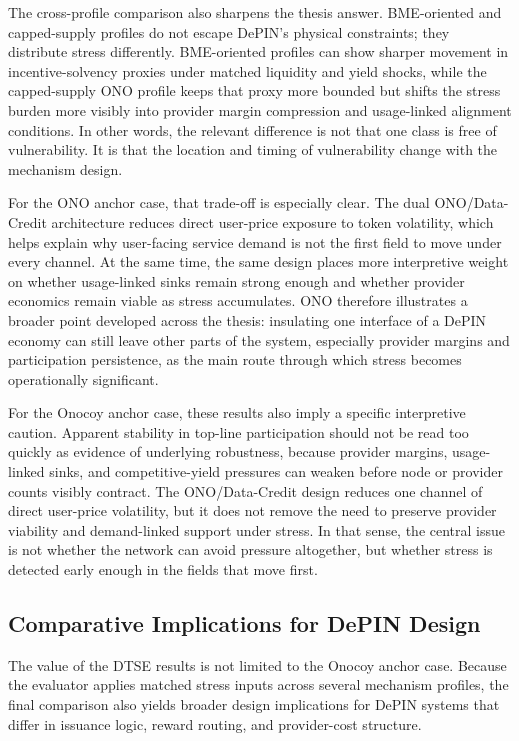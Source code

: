 The cross-profile comparison also sharpens the thesis answer. BME-oriented and capped-supply profiles do not escape DePIN's physical constraints; they distribute stress differently. BME-oriented profiles can show sharper movement in incentive-solvency proxies under matched liquidity and yield shocks, while the capped-supply ONO profile keeps that proxy more bounded but shifts the stress burden more visibly into provider margin compression and usage-linked alignment conditions. In other words, the relevant difference is not that one class is free of vulnerability. It is that the location and timing of vulnerability change with the mechanism design.

For the ONO anchor case, that trade-off is especially clear. The dual ONO/Data-Credit architecture reduces direct user-price exposure to token volatility, which helps explain why user-facing service demand is not the first field to move under every channel. At the same time, the same design places more interpretive weight on whether usage-linked sinks remain strong enough and whether provider economics remain viable as stress accumulates. ONO therefore illustrates a broader point developed across the thesis: insulating one interface of a DePIN economy can still leave other parts of the system, especially provider margins and participation persistence, as the main route through which stress becomes operationally significant.

For the Onocoy anchor case, these results also imply a specific interpretive caution. Apparent stability in top-line participation should not be read too quickly as evidence of underlying robustness, because provider margins, usage-linked sinks, and competitive-yield pressures can weaken before node or provider counts visibly contract. The ONO/Data-Credit design reduces one channel of direct user-price volatility, but it does not remove the need to preserve provider viability and demand-linked support under stress. In that sense, the central issue is not whether the network can avoid pressure altogether, but whether stress is detected early enough in the fields that move first.

\subsection{Comparative Implications for DePIN Design}
The value of the DTSE results is not limited to the Onocoy anchor case. Because the evaluator applies matched stress inputs across several mechanism profiles, the final comparison also yields broader design implications for DePIN systems that differ in issuance logic, reward routing, and provider-cost structure.

